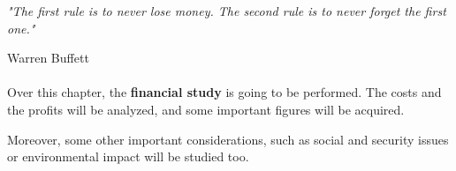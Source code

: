 \epigraph{\textit{"The first rule is to never lose money. The second rule is to never forget the first one."}}{Warren Buffett} 

\paragraph{}

Over this chapter, the \textbf{financial study} is going to be performed. The costs and the profits will be analyzed, and some important figures will be acquired. 

Moreover, some other important considerations, such as social and security issues or environmental impact will be studied too.

